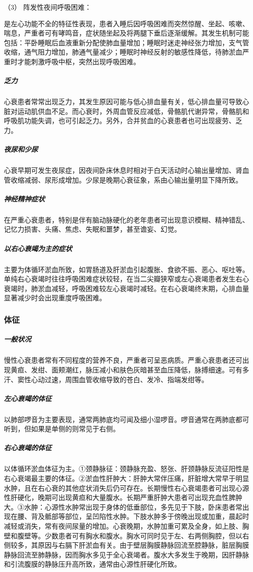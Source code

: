 \hypertarget{text00073.htmlux5cux23CHP3-3-2-3-1-1-3}{}
（3） 阵发性夜间呼吸困难：

是左心功能不全的特征性表现，患者入睡后因呼吸困难而突然惊醒、坐起、咳嗽、喘息，严重者可有哮鸣音，症状随坐起及将两腿下垂后逐渐缓解。其发生机制可能包括：平卧睡眠后血液重新分配使肺血量增加；睡眠时迷走神经张力增加，支气管收缩，通气阻力增加，肺通气量减少；睡眠时神经反射的敏感性降低，待肺淤血严重时才能刺激呼吸中枢，突然出现呼吸困难。

\subparagraph{乏力}

心衰患者常常出现乏力，其发生原因可能与低心排血量有关，低心排血量可导致心脏对运动肌供血不足。而心衰时，外周血管反应减低，骨骼肌代谢异常，骨骼肌和呼吸肌功能失调，也可引起乏力。另外，合并贫血的心衰患者也可出现疲劳、乏力。

\subparagraph{夜尿和少尿}

心衰早期可发生夜尿症，因夜间卧床休息时相对于白天活动时心输出量增加、肾血管收缩减弱、尿形成增加。少尿是晚期心衰征象，系由心输出量明显下降所致。

\subparagraph{神经精神症状}

在严重心衰患者，特别是伴有脑动脉硬化的老年患者可出现意识模糊、精神错乱、记忆力损害、头痛、焦虑、失眠和噩梦，甚至谵妄、幻觉。

\subparagraph{以右心衰竭为主的症状}

主要为体循环淤血所致，如胃肠道及肝淤血引起腹胀、食欲不振、恶心、呕吐等。单纯右心衰竭时往往呼吸困难症状较轻，在当二尖瓣狭窄或左心衰竭患者发生右心衰竭时，肺淤血减轻，呼吸困难较左心衰竭时减轻。在右心衰竭终末期，心排血量显著减少时会出现重度呼吸困难。

\subsubsection{体征}

\subparagraph{一般状况}

慢性心衰患者常有不同程度的营养不良，严重者可呈恶病质。严重心衰患者还可出现黄疸、发绀、面颊潮红，脉压减小和肤色灰暗甚至血压降低，脉搏细速。可有多汗、窦性心动过速，周围血管收缩导致的苍白、发冷、指端发绀等。

\subparagraph{左心衰竭的体征}

以肺部啰音为主要表现，通常两肺底均可闻及细小湿啰音。啰音通常在两肺底都可听到，但如果是单侧的则常见于右侧。

\subparagraph{右心衰竭的体征}

以体循环淤血体征为主。①颈静脉征：颈静脉充盈、怒张、肝颈静脉反流征阳性是右心衰竭最主要的体征。②淤血性肝肿大：肝肿大常伴压痛，肝脏增大常早于明显水肿，且在右心衰的其他症状消失后仍可存在。长期慢性右心衰竭患者可出现心源性肝硬化，晚期可出现黄疸和大量腹水。长期严重肝肿大患者可出现充血性脾肿大。③水肿：心源性水肿常出现于身体的低垂部位，多先见于下肢，卧床患者常出现在腰、背及骶部等部位，呈凹陷性水肿。下肢水肿多于傍晚出现或加重，晨起时减轻或消失，常有夜间尿量的增加。心衰晚期，水肿加重可累及全身，如上肢、胸壁和腹壁等。少数患者可有胸水和腹水。胸水可同时见于左、右两侧胸腔，但以右侧较多，其原因与右膈下肝淤血有关。由于壁层胸膜静脉回流至腔静脉，脏层胸膜静脉回流至肺静脉，因而胸水多见于全心衰竭者。腹水大多发生于晚期，因肝静脉和引流腹膜的静脉压升高所致，通常由心源性肝硬化所致。

